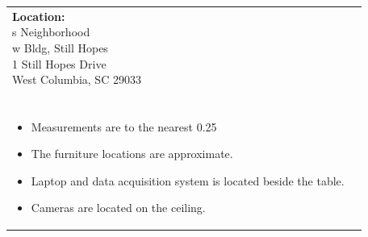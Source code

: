 \documentclass[12pt]{article}
\begin{document}
    \vspace*{\stretch1}  %
    \begin{figure}[H]
        \centering

    \end{figure}
    
    \vspace*{\fill}  %
    \begin{table}[H]
	\begin{tabular}{l l}
		\makecell[lt]{
			\textbf{Location:}\\
     		s Neighborhood \\
 		    w Bldg, Still Hopes\\
           	1 Still Hopes Drive\\
           	West Columbia, SC 29033\\\\
        }   	
        &	
		\makecell[tp{5in}]{
		\textbf{Notes:}\\
		\vspace{-8mm}  %
		\begin{itemize}
			\setlength\itemsep{-3mm}  %
			\item Measurements are to the nearest \SI{0.25}{\inch}
			\item The furniture locations are approximate.
			\item Laptop and data acquisition system is located beside the table.
			\item Cameras are located on the ceiling.
		\end{itemize}
		}	
			
	\end{tabular}
	\vspace{-8mm} %
\end{table}

    
\end{document}
